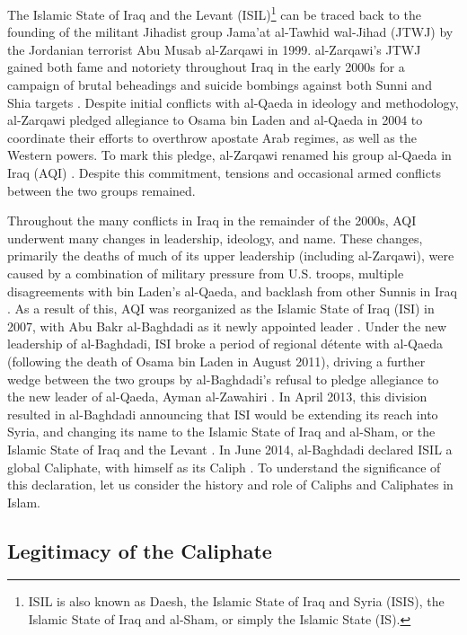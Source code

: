 \documentclass{report}
\begin{document}
    The Islamic State of Iraq and the Levant (ISIL)\footnote{ISIL is also known as Daesh, the Islamic State of Iraq and Syria (ISIS),  the Islamic State of Iraq and al-Sham, or simply the Islamic State (IS).} can be traced back to the founding of the militant Jihadist group Jama'at al-Tawhid wal-Jihad (JTWJ) by the Jordanian terrorist Abu Musab al-Zarqawi in 1999. al-Zarqawi's JTWJ gained both fame and notoriety throughout Iraq in the early 2000s for  a campaign of brutal beheadings and suicide bombings against both Sunni and Shia targets \cite{Zelin2014}. Despite initial conflicts with al-Qaeda in ideology and methodology, al-Zarqawi pledged allegiance to Osama bin Laden and al-Qaeda in 2004 to coordinate  their efforts to overthrow apostate Arab regimes, as well as the Western powers. To mark this pledge, al-Zarqawi renamed his group al-Qaeda in Iraq  (AQI) \cite{Gambill2004}. Despite this commitment, tensions and occasional armed conflicts between the two groups remained.
    
    Throughout the many conflicts in Iraq in the remainder of the 2000s, AQI underwent many changes in leadership, ideology, and name. These changes, primarily the deaths of much of its upper leadership (including al-Zarqawi), were caused by a combination of military pressure from U.S. troops, multiple disagreements  with bin Laden's al-Qaeda, and backlash from other Sunnis in Iraq \cite{Zelin2014,Kahl2008}. As a result of this, AQI was reorganized as the Islamic State of Iraq (ISI) in 2007, with Abu Bakr al-Baghdadi as it newly appointed leader \cite{Zelin2014,Shadid2010}. Under the new leadership of al-Baghdadi, ISI broke a period of regional détente with al-Qaeda (following the death of Osama bin Laden in August 2011), driving a further wedge between the two groups by al-Baghdadi's refusal to pledge allegiance to the new leader of al-Qaeda, Ayman al-Zawahiri \cite{Al-Jawlani}. In April 2013, this division resulted in  al-Baghdadi announcing that ISI would be extending its reach into Syria, and changing its name to the Islamic State of Iraq and al-Sham, or the Islamic State of Iraq and the Levant \cite{Zelin2014,Al-Hussaini2013}. In June 2014, al-Baghdadi declared ISIL a global Caliphate, with himself as its Caliph \cite{Mortada2014,TheWeek2014}. To understand the significance of this declaration, let us consider the history and role of Caliphs and Caliphates in Islam.
    
    


\subsection{Legitimacy of the Caliphate}
\end{document}

